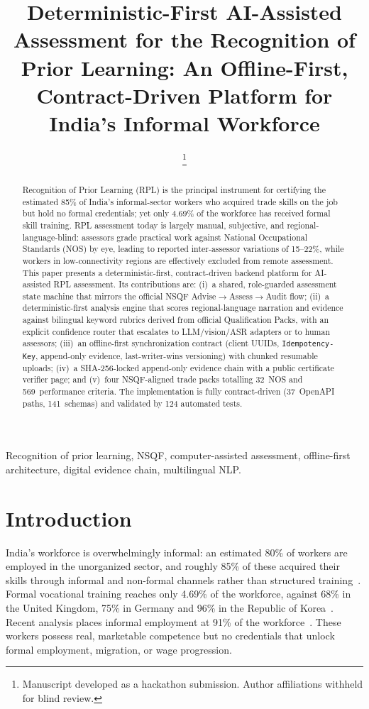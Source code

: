 \documentclass[conference]{IEEEtran}
\title{Deterministic-First AI-Assisted Assessment for the Recognition of Prior Learning: An Offline-First, Contract-Driven Platform for India's Informal Workforce}
\author{%
\IEEEauthorblockN{Team Person~B}
\IEEEauthorblockA{\textit{Independent Student Team}\\
Smart India Hackathon 2026 --- Problem Statement SIH26242\\
Email: \{firstName.lastName\}@students.example.in}
\thanks{Manuscript developed as a hackathon submission. Author affiliations withheld for blind review.}
}
\begin{document}
\maketitle

\begin{abstract}
Recognition of Prior Learning (RPL) is the principal instrument for certifying the estimated
85\% of India's informal-sector workers who acquired trade skills on the job but hold no
formal credentials; yet only 4.69\% of the workforce has received formal skill training.
RPL assessment today is largely manual, subjective, and regional-language-blind: assessors
grade practical work against National Occupational Standards (NOS) by eye, leading to
reported inter-assessor variations of 15--22\%, while workers in low-connectivity regions
are effectively excluded from remote assessment. This paper presents a deterministic-first,
contract-driven backend platform for AI-assisted RPL assessment. Its contributions are:
(i)~a shared, role-guarded assessment state machine that mirrors the official NSQF
Advise$\rightarrow$Assess$\rightarrow$Audit flow; (ii)~a deterministic-first analysis engine
that scores regional-language narration and evidence against bilingual keyword rubrics
derived from official Qualification Packs, with an explicit confidence router that escalates
to LLM/vision/ASR adapters or to human assessors; (iii)~an offline-first synchronization
contract (client UUIDs, \texttt{Idempotency-Key}, append-only evidence, last-writer-wins
versioning) with chunked resumable uploads; (iv)~a SHA-256-locked append-only evidence chain
with a public certificate verifier page; and (v)~four NSQF-aligned trade packs totalling
32~NOS and 569~performance criteria. The implementation is fully contract-driven
(37~OpenAPI paths, 141~schemas) and validated by 124 automated tests.
\end{abstract}

\begin{IEEEkeywords}
Recognition of prior learning, NSQF, computer-assisted assessment, offline-first
architecture, digital evidence chain, multilingual NLP.
\end{IEEEkeywords}

\section{Introduction}
India's workforce is overwhelmingly informal: an estimated 80\% of workers are employed in
the unorganized sector, and roughly 85\% of these acquired their skills through informal and
non-formal channels rather than structured training~\cite{unesco_uil,ilo_2024}.
Formal vocational training reaches only 4.69\% of the workforce, against 68\% in the United
Kingdom, 75\% in Germany and 96\% in the Republic of Korea~\cite{unesco_uil}. Recent analysis
places informal employment at 91\% of the workforce~\cite{mehrotra_2025}. These workers
possess real, marketable competence but no credentials that unlock formal employment,
migration, or wage progression.
\end{document}

